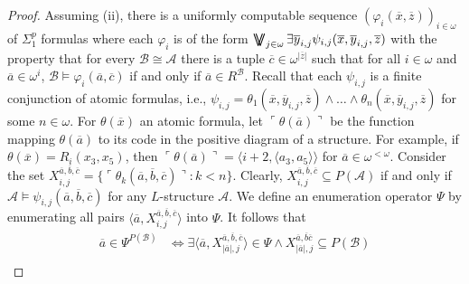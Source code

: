 \documentclass[10pt,a4paper]{amsart}
\newcommand{\A}{{\mathcal{A}}}
\newcommand{\B}{{\mathcal{B}}}
\renewcommand{\bar}[1]{\overline{#1}}
\DeclareMathOperator*{\bigdoublevee}{\bigvee\mkern-15mu\bigvee}
\renewcommand{\phi}{\varphi}
\begin{document}
\begin{proof} Assuming (ii), there is a uniformly computable sequence $(\phi_i(\overline x,\overline z))_{i\in\omega}$ of $\Sigma_1^p$ formulas where each $\phi_i$ is of the form $\bigdoublevee_{j \in \omega} \exists \overline{y}_{i,j} \psi_{i,j} (\overline{x},\overline{y}_{i,j},\overline{z})$ with the property that for every $\B\cong \A$ there is a tuple $\bar c\in \omega^{|\bar z|}$ such that for all $i\in\omega$ and $\bar a\in\omega^{i}$, $\B\models \varphi_i(\bar a,\bar c)$ if and only if $\bar a \in R^{\B}$.
Recall that each $\psi_{i,j}$ is a finite conjunction of atomic formulas, i.e., $\psi_{i,j}=\theta_1(\overline x, \overline y_{i,j},\overline z)\land \dots \land \theta_n(\overline x, \overline y_{i,j},\overline z)$ for some $n\in \omega$. For $\theta(\overline x)$ an atomic formula, let $\ulcorner \theta(\overline a)\urcorner$ be the function mapping $\theta(\overline a)$ to its code in the positive diagram of a structure. For example, if $\theta(\overline x)=R_i(x_3,x_5)$, then $\ulcorner \theta(\overline a)\urcorner=\langle i+2, \langle a_3,a_5\rangle\rangle$ for $\overline a\in \omega^{<\omega}$. Consider the set $X^{\overline a, \overline b,\overline c}_{i,j}=\{\ulcorner \theta_k(\overline a,\overline b,\overline c)\urcorner: k<n\}$. Clearly, $X^{\overline a,\overline b,\overline c}_{i,j}\subseteq P(\A)$ if and only if $\A\models \psi_{i,j}(\overline a,\overline b,\overline c)$ for any $L$-structure $\A$. We define an enumeration operator $\Psi$ by enumerating all pairs %
$\langle \overline a,X_{i,j}^{\overline a,\overline b,\overline c}\rangle$ into $\Psi$. It follows that 
\begin{align*}
    \overline a\in \Psi^{P(\B)}&\Leftrightarrow \exists \langle \overline a,X_{|\overline a|,j}^{\overline a, \overline b, \overline c}\rangle \in \Psi \land X_{|\overline a|,j}^{\overline a, \overline b\overline c}\subseteq P(\B)\\

\end{align*}
\end{proof}
\end{document}
